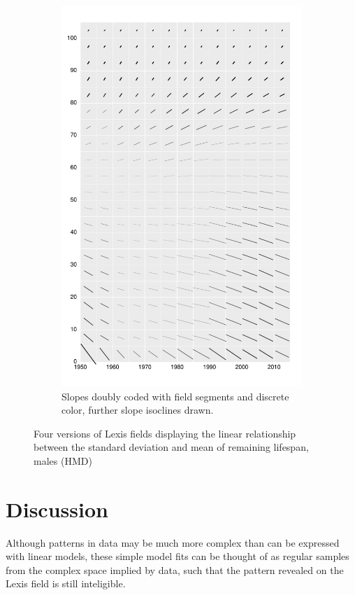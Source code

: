 \documentclass{article}
\begin{document}
\begin{figure}
\begin{subfigure}{.5\textwidth}
  \includegraphics[scale=.4]{Figures/FigApp3.pdf}
  \caption{Slopes doubly coded with field segments and discrete color, further
  slope isoclines drawn.}
  \label{fig:sfig3}
\end{subfigure}%
\caption{Four versions of Lexis fields displaying the linear
relationship between the standard deviation and mean of remaining
lifespan, males (HMD)}
\label{fig:fig}
\end{figure}

\section{Discussion}
Although patterns in data may be much more complex than can be expressed with linear models, these simple model fits can be thought of as regular samples from the complex space implied by data, such that the pattern revealed on the Lexis field is still inteligible. 


\nocite{vaupel1987thousands}

\FloatBarrier
\singlespacing

   
\end{document}
